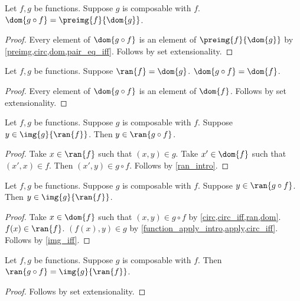 \begin{proposition}\label{dom_of_circ}
    Let $f, g$ be functions.
    Suppose $g$ is composable with $f$.
    $\dom{g\circ f} = \preimg{f}{\dom{g}}$.
\end{proposition}
\begin{proof}
    Every element of $\dom{g\circ f}$ is an element of $\preimg{f}{\dom{g}}$
        by \cref{preimg,circ,dom,pair_eq_iff}.
    Follows by set extensionality.
\end{proof}

\begin{proposition}\label{dom_circ_exact}
    Let $f, g$ be functions.
    Suppose $\ran{f} = \dom{g}$.
    $\dom{g\circ f} = \dom{f}$.
\end{proposition}
\begin{proof}
    Every element of $\dom{g\circ f}$ is an element of $\dom{f}$.
    Follows by set extensionality.
\end{proof}

\begin{proposition}\label{ran_of_circ_intro}
    Let $f, g$ be functions.
    Suppose $g$ is composable with $f$.
    Suppose $y\in \img{g}{\ran{f}}$.
    Then $y\in \ran{g\circ f}$.
\end{proposition}
\begin{proof}
    Take $x\in\ran{f}$ such that $(x, y)\in g$.
    Take $x'\in\dom{f}$ such that $(x', x)\in f$.
    Then $(x', y) \in g\circ f$.
    Follows by \cref{ran_intro}.
\end{proof}

\begin{proposition}\label{ran_of_circ_elim}
    Let $f, g$ be functions.
    Suppose $g$ is composable with $f$.
    Suppose $y\in \ran{g\circ f}$.
    Then $y\in \img{g}{\ran{f}}$.
\end{proposition}
\begin{proof}
    Take $x\in\dom{f}$ such that $(x, y)\in g\circ f$
        by \cref{circ,circ_iff,ran,dom}.
    $f(x)\in\ran{f}$.
    $(f(x), y)\in g$
        by \cref{function_apply_intro,apply,circ_iff}.
    Follows by \cref{img_iff}.
\end{proof}

\begin{proposition}\label{ran_of_circ}
    Let $f, g$ be functions.
    Suppose $g$ is composable with $f$.
    Then $\ran{g\circ f} = \img{g}{\ran{f}}$.
\end{proposition}
\begin{proof}
    Follows by set extensionality.
\end{proof}

